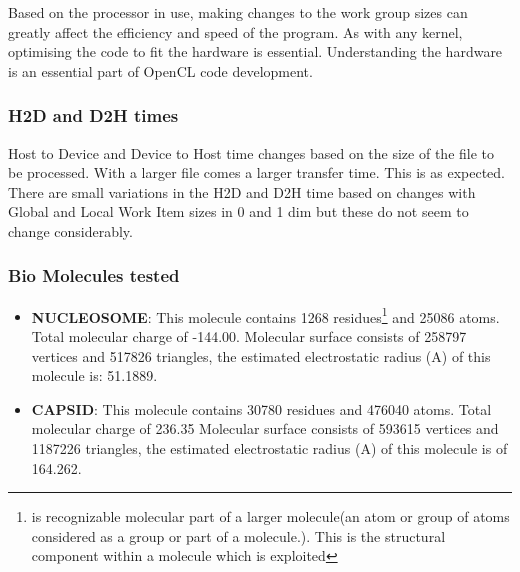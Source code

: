 \par{Based on the processor in use, making changes to the work group sizes can greatly affect the
    efficiency and speed of the program. As with any kernel, optimising the code to fit the hardware 
    is essential. Understanding the hardware is an essential part of OpenCL code development.}

\subsubsection{H2D and D2H times}
\par{Host to Device and Device to Host time changes based on the size of the file to be processed. 
    With a larger file comes a larger transfer time. This is as expected. 
    There are small variations in the H2D and D2H time based on changes with 
    Global and Local Work Item sizes in 0 and 1 dim but these do not seem to change considerably.}

\subsubsection{Bio Molecules tested}
\begin{itemize}
    \item \textbf{NUCLEOSOME}: This molecule contains 1268 residues\footnote{is recognizable molecular 
                            part of a larger molecule(an atom or group of atoms considered as a group 
                            or part of a molecule.). This is the structural component within a molecule 
                            which is exploited} and 25086 atoms. Total molecular charge of -144.00.
                            Molecular surface consists of 258797 vertices and 517826 triangles,
                            the estimated electrostatic radius (A) of this molecule is: 51.1889.
    \item  \textbf{CAPSID}: This molecule contains 30780 residues and 476040 atoms. Total molecular charge of 236.35
                            Molecular surface consists of 593615 vertices and 1187226 triangles,
                            the estimated electrostatic radius (A) of this molecule is of 164.262.
\end{itemize}



